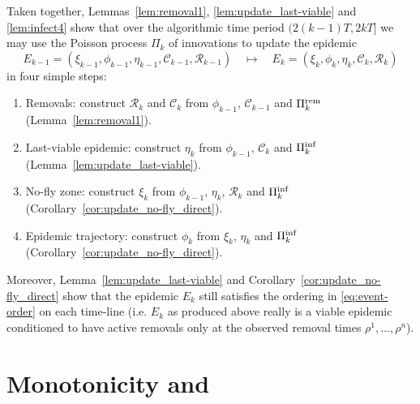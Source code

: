 \documentclass[]{article}
\newcommand{\Conditioned}{\mathcal{C}}
\newcommand{\Epidemic}{E}%
\newcommand{\Removals}{\mathcal{R}}
\newcommand{\Poisson}{\Pi}
\newcommand{\PoissonRem}{\Poisson^\textup{rem}}
\newcommand{\PoissonInf}{\Poisson^\textup{inf}}
\begin{document}
\begin{rem}\label{rem:update_structure}
	Taken together, Lemmas~\ref{lem:removal1}, \ref{lem:update_last-viable} and \ref{lem:infect4} show that over the algorithmic time period \((2(k{-}1)T,2kT]\) we may use the Poisson process \(\Poisson_k\) of innovations to update the epidemic 
    \[
    	\Epidemic_{k-1} = (\xi_{k-1}, \phi_{k-1}, \eta_{k-1}, \Conditioned_{k-1}, \Removals_{k-1}) \quad \mapsto \quad \Epidemic_k =(\xi_k, \phi_k, \eta_k, \Conditioned_k, \Removals_k)
    \]
    in four simple steps:
\begin{enumerate}
	\item{} Removals: construct \(\Removals_k\) and \(\Conditioned_k\) from \(\phi_{k-1}\), \(\Conditioned_{k-1}\) and \(\PoissonRem_k\) (Lemma~\ref{lem:removal1}).
	\item{} Last-viable epidemic: construct \(\eta_k\) from \(\phi_{k-1}\), \(\Conditioned_k\) and \(\PoissonInf_k\) (Lemma~\ref{lem:update_last-viable}).
	\item{} No-fly zone: construct \(\xi_k\) from \(\phi_{k-1}\), \(\eta_k\), \(\Removals_k\) and \(\PoissonInf_k\) (Corollary~\ref{cor:update_no-fly_direct}).
	\item{} Epidemic trajectory: construct \(\phi_k\) from \(\xi_k\), \(\eta_k\) and \(\PoissonInf_k\) (Corollary~\ref{cor:update_no-fly_direct}).
\end{enumerate}
Moreover, Lemma~\ref{lem:update_last-viable} and Corollary~\ref{cor:update_no-fly_direct} show that the epidemic \(\Epidemic_k\) still satisfies the ordering in \eqref{eq:event-order} on each time-line (i.e. \(\Epidemic_k\) as produced above really is a viable epidemic conditioned to have active removals only at the observed removal times \(\rho^1, \dots,\rho^n\)).
\end{rem}


 
 \section{Monotonicity and \CFTP}\label{sec:cftp}

\end{document}
